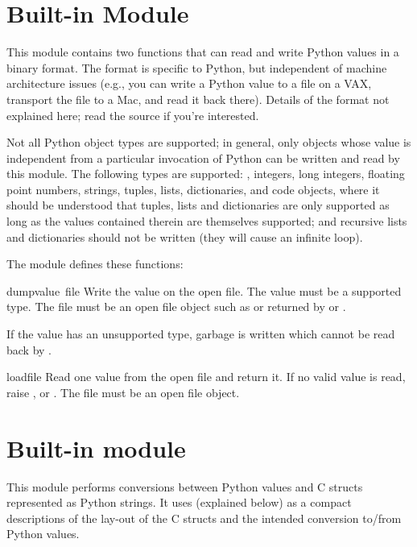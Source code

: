 \section{Built-in Module }

This module contains two functions that can read and write Python
values in a binary format.  The format is specific to Python, but
independent of machine architecture issues (e.g., you can write a
Python value to a file on a VAX, transport the file to a Mac, and read
it back there).  Details of the format not explained here; read the
source if you're interested.

Not all Python object types are supported; in general, only objects
whose value is independent from a particular invocation of Python can
be written and read by this module.  The following types are supported:
, integers, long integers, floating point numbers,
strings, tuples, lists, dictionaries, and code objects, where it
should be understood that tuples, lists and dictionaries are only
supported as long as the values contained therein are themselves
supported; and recursive lists and dictionaries should not be written
(they will cause an infinite loop).

The module defines these functions:

\renewcommand{\indexsubitem}{(in module marshal)}
\begin{funcdesc}{dump}{value\, file}
  Write the value on the open file.  The value must be a supported
  type.  The file must be an open file object such as
   or returned by  or
  .
  
  If the value has an unsupported type, garbage is written which cannot
  be read back by .
\end{funcdesc}

\begin{funcdesc}{load}{file}
  Read one value from the open file and return it.  If no valid value
  is read, raise ,  or
  .  The file must be an open file object.
\end{funcdesc}

\section{Built-in module }

This module performs conversions between Python values and C
structs represented as Python strings.  It uses 
(explained below) as a compact descriptions of the lay-out of the C
structs and the intended conversion to/from Python values.

